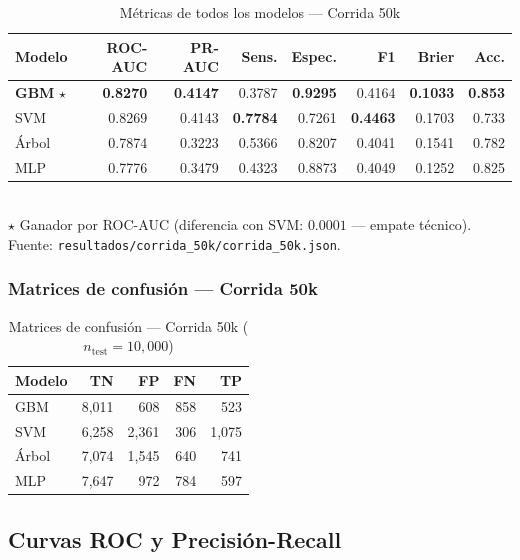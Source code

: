 \documentclass[12pt,a4paper]{article}
\begin{document}
\begin{table}[H]
  \centering
  \caption{Métricas de todos los modelos — Corrida 50k}
  \label{tab:corrida50k}
  \begin{tabular}{lrrrrrrr}
    \toprule
    \textbf{Modelo} & \textbf{ROC-AUC} & \textbf{PR-AUC} & \textbf{Sens.} & \textbf{Espec.} & \textbf{F1} & \textbf{Brier} & \textbf{Acc.}\\
    \midrule
    \textbf{GBM} $\star$ & \textbf{0.8270} & \textbf{0.4147} & 0.3787 & \textbf{0.9295} & 0.4164 & \textbf{0.1033} & \textbf{0.853}\\
    SVM & 0.8269 & 0.4143 & \textbf{0.7784} & 0.7261 & \textbf{0.4463} & 0.1703 & 0.733\\
    Árbol & 0.7874 & 0.3223 & 0.5366 & 0.8207 & 0.4041 & 0.1541 & 0.782\\
    MLP & 0.7776 & 0.3479 & 0.4323 & 0.8873 & 0.4049 & 0.1252 & 0.825\\
    \bottomrule
  \end{tabular}
  \smallskip\\
  \footnotesize $\star$ Ganador por ROC-AUC (diferencia con SVM: $0.0001$ — empate técnico). Fuente: \texttt{resultados/corrida\_50k/corrida\_50k.json}.
\end{table}

\subsubsection{Matrices de confusión — Corrida 50k}

\begin{table}[H]
  \centering
  \caption{Matrices de confusión — Corrida 50k ($n_{\text{test}}=10{,}000$)}
  \label{tab:cm50k}
  \begin{tabular}{lrrrr}
    \toprule
    \textbf{Modelo} & \textbf{TN} & \textbf{FP} & \textbf{FN} & \textbf{TP}\\
    \midrule
    GBM & 8{,}011 & 608 & 858 & 523\\
    SVM & 6{,}258 & 2{,}361 & 306 & 1{,}075\\
    Árbol & 7{,}074 & 1{,}545 & 640 & 741\\
    MLP & 7{,}647 & 972 & 784 & 597\\
    \bottomrule
  \end{tabular}
\end{table}

\subsection{Curvas ROC y Precisión-Recall}
\end{document}
